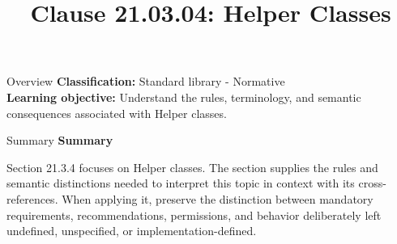 \documentclass[10pt,letterpaper]{article}
\title{Clause 21.03.04: Helper Classes}
\author{}
\date{}
\begin{document}
\maketitle
\begin{CornellOverviewBox}{Overview}
\textbf{Classification:} Standard library - Normative\\[2pt]
\textbf{Learning objective:} Understand the rules, terminology, and semantic consequences associated with Helper classes.
\end{CornellOverviewBox}\begin{CornellSummaryBox}{Summary}
{\sffamily\bfseries\color{Accent} Summary}\par\vspace{3pt}Section 21.3.4 focuses on Helper classes. The section supplies the rules and semantic distinctions needed to interpret this topic in context with its cross-references. When applying it, preserve the distinction between mandatory requirements, recommendations, permissions, and behavior deliberately left undefined, unspecified, or implementation-defined.
\end{CornellSummaryBox}
\end{document}
